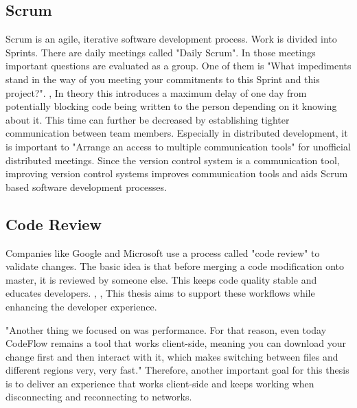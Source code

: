 \subsection{Scrum}
Scrum is an agile, iterative software development process. Work is divided into Sprints. There are daily meetings called "Daily Scrum". In those meetings important questions are evaluated as a group. One of them is "What impediments stand in the way of you meeting your commitments to this Sprint and this project?". \cite{schwaber2004agile}, \cite{10.1007/978-1-4471-0947-1_11}
In theory this introduces a maximum delay of one day from potentially blocking code being written to the person depending on it knowing about it. This time can further be decreased by establishing tighter communication between team members.
Especially in distributed development, it is important to "Arrange an access to multiple communication tools" \cite{5196933} for unofficial distributed meetings. \cite{4638656}
Since the version control system is a communication tool, improving version control systems improves communication tools and aids Scrum based software development processes.

\subsection{Code Review}

Companies like Google and Microsoft use a process called "code review" to validate changes. The basic idea is that before merging a code modification onto master, it is reviewed by someone else. This keeps code quality stable and educates developers. \cite{SadowskiSoederbergChurchSipkoBacchelli:2018:Moderncodereview:acasestudyatgoogle}, \cite{Bacchelli:2013:EOC:2486788.2486882}, \cite{7081824} This thesis aims to support these workflows while enhancing the developer experience. 

"Another thing we focused on was performance. For that
reason, even today CodeFlow remains a tool that works
client-side, meaning you can download your change first
and then interact with it, which makes switching between
files and different regions very, very fast." \cite{CzerwonkaGreilerBirdPanjerCoatta:2018:CodeFlow:ImprovingtheCodeReviewProcessatMicrosoft} Therefore, another important goal for this thesis is to deliver an experience that works client-side and keeps working when disconnecting and reconnecting to networks.